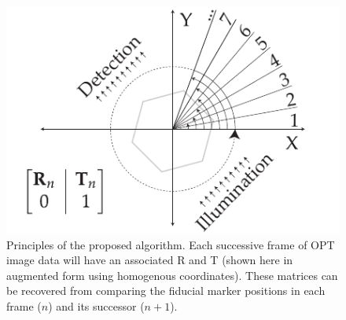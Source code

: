 \begin{figure}
  \centering
  \includegraphics{./figures/flOPT_principle}
  \caption[Principles of the proposed algorithm]{Principles of the proposed algorithm. Each successive frame of \gls{OPT} image data will have an associated \gls{R} and \gls{T} (shown here in augmented form using homogenous coordinates). These matrices can be recovered from comparing the fiducial marker positions in each frame (\(n\)) and its successor (\(n+1\)).}
\end{figure}



